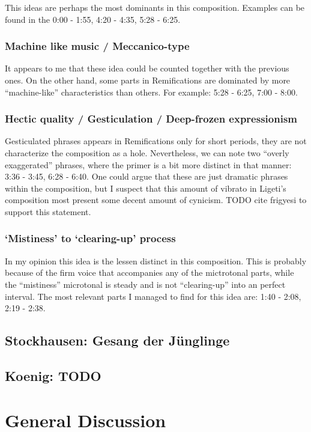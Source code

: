 \documentclass[a4paper,11pt]{article}
\begin{document}
This ideas are perhaps the most dominants in this composition.
Examples can be found in the 0:00 - 1:55, 4:20 - 4:35, 5:28 - 6:25.

\subsubsection{Machine like music / Meccanico-type}

It appears to me that these idea could be counted together with the previous ones.
On the other hand, some parts in Remifications are dominated by more ``machine-like'' characteristics than others.
For example: 5:28 - 6:25, 7:00 - 8:00.

\subsubsection{Hectic quality / Gesticulation / Deep-frozen expressionism}

Gesticulated phrases appears in Remifications only for short periods, they are not characterize the composition as a hole.
Nevertheless, we can note two ``overly exaggerated'' phrases, where the primer is a bit more distinct in that manner: 3:36 - 3:45, 6:28 - 6:40.
One could argue that these are just dramatic phrases within the composition, but I suspect that this amount of vibrato in Ligeti's composition most present some decent amount of cynicism.
TODO cite frigyesi to support this statement.

\subsubsection{‘Mistiness’ to ‘clearing-up’ process}

In my opinion this idea is the lessen distinct in this composition.
This is probably because of the firm voice that accompanies any of the mictrotonal parts, while the ``mistiness'' microtonal is steady and is not ``clearing-up'' into an perfect interval.
The most relevant parts I managed to find for this idea are: 1:40 - 2:08, 2:19 - 2:38.

\subsection{Stockhausen: Gesang der J{\"u}nglinge}
\label{sub:composition_stockhausen}

\subsection{Koenig: TODO}
\label{sub:composition_koenig}

\section{General Discussion}
\label{sec:general_discussion}

\printbibliography[title={Bibliography}]
\end{document}
